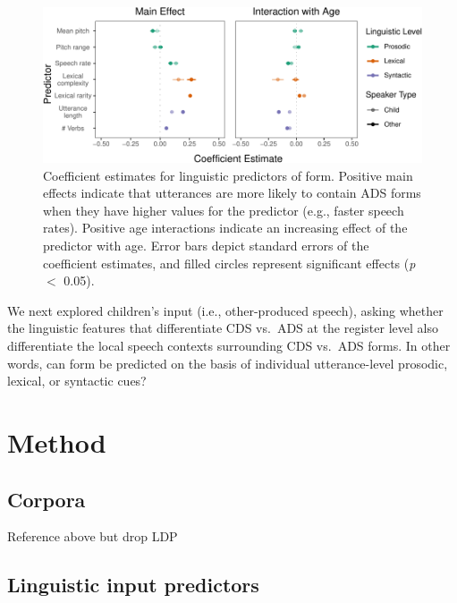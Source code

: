 \documentclass[10pt, letterpaper]{article}
\newenvironment{CodeChunk}{}{}
\begin{document}
\begin{CodeChunk}
\begin{figure}[h]

{\centering \includegraphics{figs/ling-predictors-fig-1} 

}

\caption[Coefficient estimates for linguistic predictors of form]{Coefficient estimates for linguistic predictors of form. Positive main effects indicate that utterances are more likely to contain ADS forms when they have higher values for the predictor (e.g., faster speech rates). Positive age interactions indicate an increasing effect of the predictor with age. Error bars depict standard errors of the coefficient estimates, and filled circles represent significant effects (\textit{p} $<$ 0.05).}\label{fig:ling-predictors-fig}
\end{figure}
\end{CodeChunk}

We next explored children's input (i.e., other-produced speech), asking
whether the linguistic features that differentiate CDS vs.~ADS at the
register level also differentiate the local speech contexts surrounding
CDS vs.~ADS forms. In other words, can form be predicted on the basis of
individual utterance-level prosodic, lexical, or syntactic cues?

\hypertarget{method-1}{%
\section{Method}\label{method-1}}

\hypertarget{corpora-1}{%
\subsection{Corpora}\label{corpora-1}}

Reference above but drop LDP

\hypertarget{linguistic-input-predictors}{%
\subsection{Linguistic input
predictors}\label{linguistic-input-predictors}}
\end{document}
